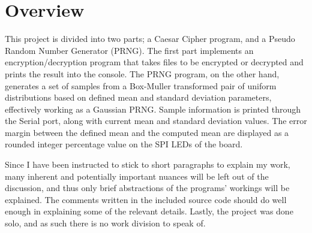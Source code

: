\documentclass{article}
\begin{document}


\section*{Overview}
\justify
\large

This project is divided into two parts; a Caesar Cipher program, and a Pseudo Random Number Generator (PRNG). The first part implements an encryption/decryption program that takes files to be encrypted or decrypted and prints the result into the console. The PRNG program, on the other hand, generates a set of samples from a Box-Muller transformed pair of uniform distributions based on defined mean and standard deviation parameters, effectively working as a Gaussian PRNG. Sample information is printed through the Serial port, along with current mean and standard deviation values. The error margin between the defined mean and the computed mean are displayed as a rounded integer percentage value on the SPI LEDs of the board.

Since I have been instructed to stick to short paragraphs to explain my work, many inherent and potentially important nuances will be left out of the discussion, and thus only brief abstractions of the programs' workings will be explained. The comments written in the included source code should do well enough in explaining some of the relevant details. Lastly, the project was done solo, and as such there is no work division to speak of.\pagebreak
\end{document}
